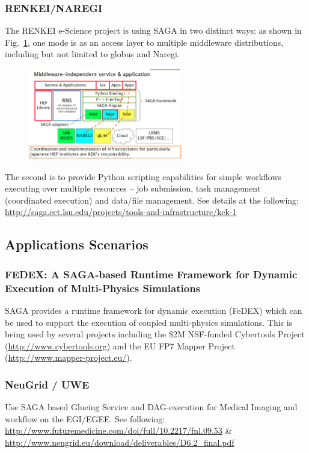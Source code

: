 \documentclass[12pt]{article}
\begin{document}
\subsubsection*{RENKEI/NAREGI}

The RENKEI e-Science project is using SAGA in two distinct ways: as
shown in Fig.~\ref{fig:renkei}, one mode is as an access layer to
multiple middleware distributions, including but not limited to globus
and Naregi.
\begin{figure}[t]
      \centering
      \includegraphics[width=0.6\textwidth]{saga-renkei.png}
      \caption{\footnotesize }
      \label{fig:renkei}
\end{figure}
The second is to provide Python scripting capabilities for simple
workflows executing over multiple resources -- job submission, task
management (coordinated execution) and data/file management.  See
details at the following:
\url{http://saga.cct.lsu.edu/projects/tools-and-infrastructure/kek-1}


\subsection{Applications Scenarios}

\subsubsection*{FEDEX: A SAGA-based Runtime Framework for Dynamic
  Execution of Multi-Physics Simulations}
SAGA provides a runtime framework for dynamic execution (FeDEX) which
can be used to support the execution of coupled multi-physics
simulations. This is being used by several projects including the \$2M
NSF-funded Cybertools Project (\url{http://www.cybertools.org}) and
the EU FP7 Mapper Project (\url{http://www.mapper-project.eu/}).

\subsubsection*{NeuGrid / UWE}
Use SAGA based Glueing Service and DAG-execution for Medical Imaging
and workflow on the EGI/EGEE.  See following:
\url{http://www.futuremedicine.com/doi/full/10.2217/fnl.09.53} \&
\url{http://www.neugrid.eu/download/deliverables/D6.2_final.pdf}
\end{document}
